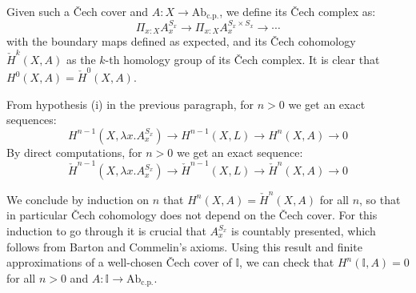 \documentclass[letterpaper]{../util/easychair}
\newcommand{\N}{\mathbb{N}}
\begin{document}
Given such a \v{C}ech cover and $A:X\to \mathrm{Ab}_{\mathrm{c.p.}}$, we define its \v{C}ech complex as:
\[\Pi_{x:X}A_x^{S_x} \to \Pi_{x:X}A_x^{S_x\times S_x} \to \cdots\]
with the boundary maps defined as expected, and its \v{C}ech cohomology $\check{H}^k(X,A)$ as the $k$-th homology group of its \v{C}ech complex. It is clear that $H^0(X,A) = \check{H}^0(X,A)$.

From hypothesis (i) in the previous paragraph, for $n>0$ we get an exact sequences:
\[H^{n-1}(X,\lambda x.A_x^{S_x}) \to H^{n-1}(X,L)\to H^n(X,A)\to 0\]
By direct computations, for $n>0$ we get an exact sequence:
\[\check{H}^{n-1}(X,\lambda x.A_x^{S_x}) \to \check{H}^{n-1}(X,L)\to \check{H}^n(X,A)\to 0\]

We conclude by induction on $n$ that $H^n(X,A) = \check{H}^n(X,A)$ for all $n$, so that in particular \v{C}ech cohomology does not depend on the \v{C}ech cover. For this induction to go through it is crucial that $A_x^{S_x}$ is countably presented, which follows from Barton and Commelin's axioms.  Using this result and finite approximations of a well-chosen \v{C}ech cover of $\mathbb{I}$, we can check that $H^n(\mathbb{I},A) = 0$ for all $n>0$ and $A:\mathbb{I}\to \mathrm{Ab}_{\mathrm{c.p.}}$.


\printbibliography
\end{document}
